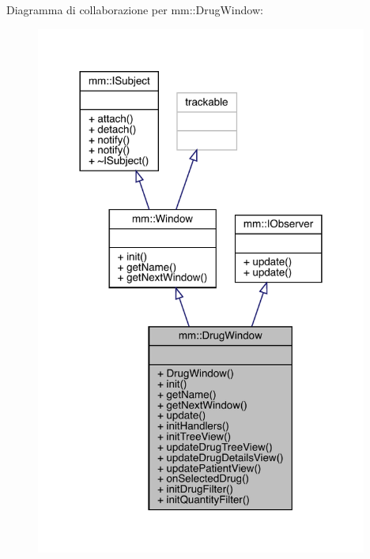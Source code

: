 Diagramma di collaborazione per mm\+:\+:Drug\+Window\+:
\nopagebreak
\begin{figure}[H]
\begin{center}
\leavevmode
\includegraphics[width=309pt]{d8/d52/classmm_1_1_drug_window__coll__graph}
\end{center}
\end{figure}
